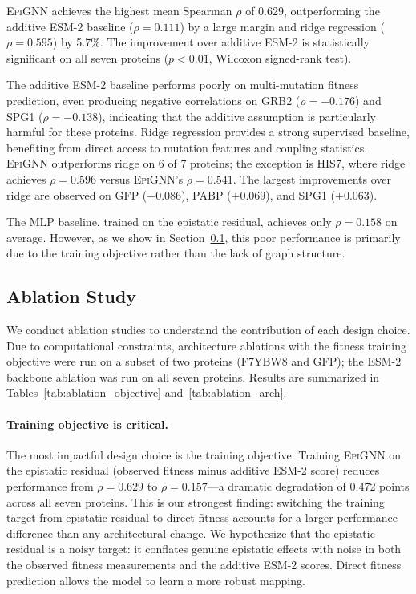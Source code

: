 \documentclass{article}
\newcommand{\epignn}{\textsc{EpiGNN}}
\begin{document}
\epignn{} achieves the highest mean Spearman $\rho$ of 0.629, outperforming the additive ESM-2 baseline ($\rho = 0.111$) by a large margin and ridge regression ($\rho = 0.595$) by 5.7\%.
The improvement over additive ESM-2 is statistically significant on all seven proteins ($p < 0.01$, Wilcoxon signed-rank test).

The additive ESM-2 baseline performs poorly on multi-mutation fitness prediction, even producing negative correlations on GRB2 ($\rho = -0.176$) and SPG1 ($\rho = -0.138$), indicating that the additive assumption is particularly harmful for these proteins.
Ridge regression provides a strong supervised baseline, benefiting from direct access to mutation features and coupling statistics.
\epignn{} outperforms ridge on 6 of 7 proteins; the exception is HIS7, where ridge achieves $\rho = 0.596$ versus \epignn{}'s $\rho = 0.541$.
The largest improvements over ridge are observed on GFP ($+0.086$), PABP ($+0.069$), and SPG1 ($+0.063$).

The MLP baseline, trained on the epistatic residual, achieves only $\rho = 0.158$ on average.
However, as we show in Section~\ref{sec:ablation}, this poor performance is primarily due to the training objective rather than the lack of graph structure.

\subsection{Ablation Study}
\label{sec:ablation}

We conduct ablation studies to understand the contribution of each design choice.
Due to computational constraints, architecture ablations with the fitness training objective were run on a subset of two proteins (F7YBW8 and GFP); the ESM-2 backbone ablation was run on all seven proteins.
Results are summarized in Tables~\ref{tab:ablation_objective} and~\ref{tab:ablation_arch}.

\paragraph{Training objective is critical.}
The most impactful design choice is the training objective.
Training \epignn{} on the epistatic residual (observed fitness minus additive ESM-2 score) reduces performance from $\rho = 0.629$ to $\rho = 0.157$---a dramatic degradation of 0.472 points across all seven proteins.
This is our strongest finding: switching the training target from epistatic residual to direct fitness accounts for a larger performance difference than any architectural change.
We hypothesize that the epistatic residual is a noisy target: it conflates genuine epistatic effects with noise in both the observed fitness measurements and the additive ESM-2 scores.
Direct fitness prediction allows the model to learn a more robust mapping.
\end{document}
